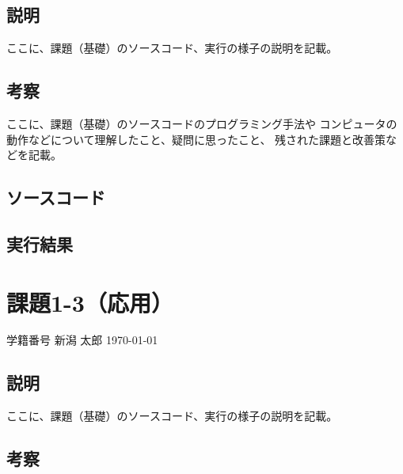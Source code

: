 \documentclass[a4paper,12pt]{jsarticle}
\newcommand{\mynumber}{学籍番号} %
\newcommand{\myname}{新潟 太郎} %
\newcommand{\myheader}{ %
\begin{flushright}
\mynumber\hspace{1zw} \myname\hspace{1zw} \today\end{flushright}}
\begin{document}
\subsection*{説明}

ここに、課題（基礎）のソースコード、実行の様子の説明を記載。

\subsection*{考察}

ここに、課題（基礎）のソースコードのプログラミング手法や
コンピュータの動作などについて理解したこと、疑問に思ったこと、
残された課題と改善策などを記載。

\subsection*{ソースコード}


\subsection*{実行結果}



\newpage
\section*{課題1-3（応用）}
\myheader

\subsection*{説明}

ここに、課題（基礎）のソースコード、実行の様子の説明を記載。

\subsection*{考察}
\end{document}
